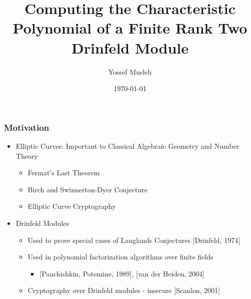 \documentclass{beamer}
\title[master talk]{Computing the Characteristic Polynomial of a Finite Rank Two Drinfeld Module} %
\author{Yossef Musleh} %
\institute[UW] %
{
University of Waterloo \\ %
\medskip
\textit{ymusleh@uwaterloo.ca} %
}
\date{\today} %
\begin{document}
\begin{frame}
\titlepage %
\end{frame}



\begin{frame}
\frametitle{Motivation}

\begin{itemize}

\item  Elliptic Curves: Important to Classical Algebraic Geometry and Number Theory

\begin{itemize}
    \item Fermat's Last Theorem
    \item Birch and Swinnerton-Dyer Conjecture
    \item Elliptic Curve Cryptography
    
\end{itemize}

\item Drinfeld Modules
\begin{itemize}
    \item Used to prove special cases of Langlands Conjectures [Drinfeld, 1974]
    \item Used in polynomial factorization algorithms over finite fields
    \begin{itemize}
        \item $[$Panchishkin, Potemine, 1989], [van der Heiden, 2004]
    \end{itemize}
    \item Cryptography over Drinfeld modules - insecure [Scanlon, 2001]
\end{itemize}
  
  
  
  
\end{itemize}

\end{frame}
\end{document}
